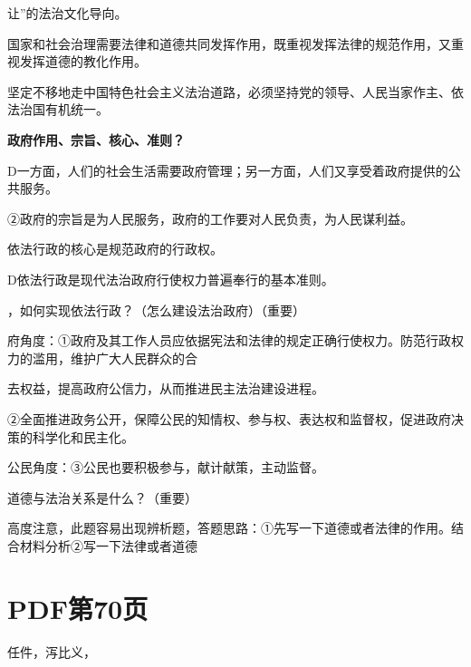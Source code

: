 \documentclass[lang=cn,11pt]{elegantbook}
\newcommand{\daofasym}[1]{{\daofasymbolfont #1}}
\newcommand{\daofasym}[1]{#1}
\begin{document}
让”的法治文化导向。\par

国家和社会治理需要法律和道德共同发挥作用，既重视发挥法律的规范作用，又重视发挥道德的教化作用。\par

坚定不移地走中国特色社会主义法治道路，必须坚持党的领导、人民当家作主、依法治国有机统一。\par

\textbf{政府作用、宗旨、核心、准则？}\par

D一方面，人们的社会生活需要政府管理；另一方面，人们又享受着政府提供的公共服务。\par

\daofasym{②}政府的宗旨是为人民服务，政府的工作要对人民负责，为人民谋利益。\par

依法行政的核心是规范政府的行政权。\par

D依法行政是现代法治政府行使权力普遍奉行的基本准则。\par

，如何实现依法行政？（怎么建设法治政府）（重要）\par

府角度：\daofasym{①}政府及其工作人员应依据宪法和法律的规定正确行使权力。防范行政权力的滥用，维护广大人民群众的合\par

去权益，提高政府公信力，从而推进民主法治建设进程。\par

\daofasym{②}全面推进政务公开，保障公民的知情权、参与权、表达权和监督权，促进政府决策的科学化和民主化。\par

公民角度：\daofasym{③}公民也要积极参与，献计献策，主动监督。\par

道德与法治关系是什么？（重要）\par

高度注意，此题容易出现辨析题，答题思路：\daofasym{①}先写一下道德或者法律的作用。结合材料分析\daofasym{②}写一下法律或者道德\par


\section*{PDF第70页}

任件，泻比义，\par
\end{document}
